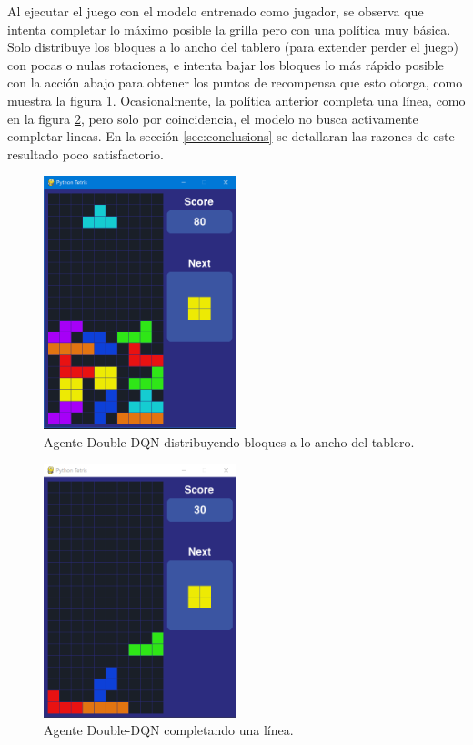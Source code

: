 Al ejecutar el juego con el modelo entrenado como jugador, se observa que intenta completar lo máximo posible la grilla pero con una política muy básica. Solo distribuye los bloques a lo ancho del tablero (para extender perder el juego) con pocas o nulas rotaciones, e intenta bajar los bloques lo más rápido posible con la acción abajo para obtener los puntos de recompensa que esto otorga, como muestra la figura \ref{fig:ddqn_playing}. Ocasionalmente, la política anterior completa una línea, como en la figura \ref{fig:ddqn_playing_line}, pero solo por coincidencia, el modelo no busca activamente completar lineas. En la sección \ref{sec:conclusions} se detallaran las razones de este resultado poco satisfactorio.

\begin{figure}[hbt!]
	\centering
	\includegraphics[width=0.5\textwidth]{./Figures/ddqn_playing.png}
	\caption{Agente Double-DQN distribuyendo bloques a lo ancho del tablero.}
	\label{fig:ddqn_playing}
\end{figure}

\begin{figure}[htbp]
	\centering
	\includegraphics[width=0.5\textwidth]{./Figures/ddqn_playing_line.png}
	\caption{Agente Double-DQN completando una línea.}
	\label{fig:ddqn_playing_line}
\end{figure}

